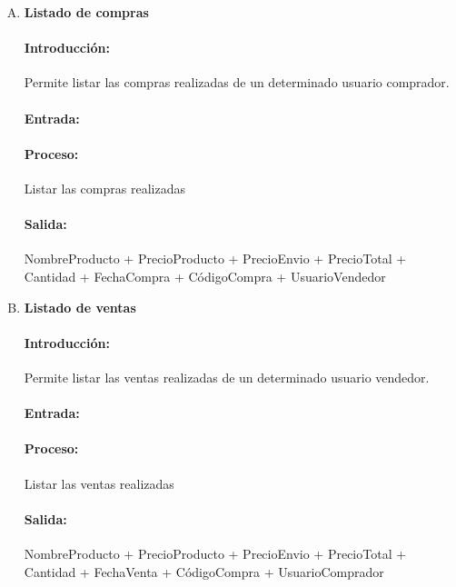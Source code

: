\begin{enumerate}[A.]
        \item \textbf{Listado de compras}
        
        \paragraph{Introducción:} Permite listar las compras realizadas de un determinado usuario comprador.
        
        
        \paragraph{Entrada:} 
        
        \paragraph{Proceso:} Listar las compras realizadas
        
        \paragraph{Salida:} {NombreProducto + PrecioProducto + PrecioEnvio + PrecioTotal + Cantidad + FechaCompra + CódigoCompra + UsuarioVendedor}
        
         \item \textbf{Listado de ventas}
        
        \paragraph{Introducción:} Permite listar las ventas realizadas de un determinado usuario vendedor.
        
        \paragraph{Entrada:}
        
        \paragraph{Proceso:} Listar las ventas realizadas
        
        \paragraph{Salida:} {NombreProducto + PrecioProducto + PrecioEnvio + PrecioTotal + Cantidad + FechaVenta + CódigoCompra + UsuarioComprador}
 
         \end{enumerate}
         
